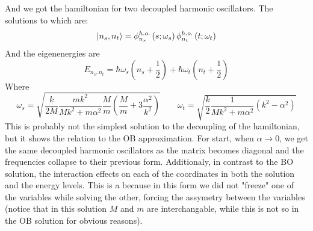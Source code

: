 \documentclass{article}
\begin{document}
And we got the hamiltonian for two decoupled harmonic oscillators.
The solutions to which are:
\begin{equation}
    \ket{n_s, n_t} = \phi_{n_s}^{h.o.}\left(s; \omega_s\right)\phi_{n_t}^{h.o.}\left(t;\omega_t\right)
\end{equation}
And the eigenenergies are
\begin{equation}
    E_{n_s, n_t} = \hbar\omega_s \left(n_s + \frac{1}{2}\right) + \hbar\omega_t \left(n_t + \frac{1}{2}\right)
\end{equation}
Where
\begin{equation}
    \omega_s = \sqrt{\frac{k}{2M}\frac{mk^2}{Mk^2 + m\alpha^2}\frac{M}{m}\left(\frac{M}{m} + 3\frac{\alpha^2}{k^2}\right)}
    \qquad
    \omega_t = \sqrt{\frac{k}{2}\frac{1}{Mk^2 + m\alpha^2}\left(k^2 - \alpha^2\right)}
\end{equation}
This is probably not the simplest solution to the decoupling of the hamiltonian, but it shows the relation to the OB approximation. For start, when $\alpha \rightarrow 0$, we get the same decoupled harmonic oscillators as the matrix becomes diagonal and the frequencies collapse to their previous form.
\newline
Additionaly, in contrast to the BO solution, the interaction effects on each of the coordinates in both the solution and the energy levels. This is a because in this form we did not "freeze" one of the variables while solving the other, forcing the assymetry between the variables (notice that in this solution $M$ and $m$ are interchangable, while this is not so in the OB solution for obvious reasons).
\end{document}
